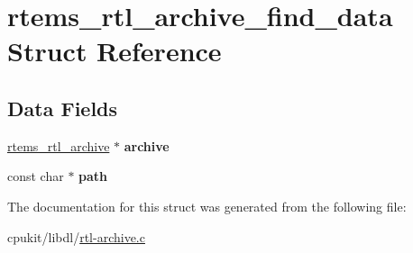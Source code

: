 \hypertarget{structrtems__rtl__archive__find__data}{}\section{rtems\+\_\+rtl\+\_\+archive\+\_\+find\+\_\+data Struct Reference}
\label{structrtems__rtl__archive__find__data}
\subsection*{Data Fields}
\begin{DoxyCompactItemize}
\item 
\mbox{\label{structrtems__rtl__archive__find__data_a90373abadd9cbe344328513ab8999168}} 
\mbox{\hyperlink{structrtems__rtl__archive}{rtems\+\_\+rtl\+\_\+archive}} $\ast$ {\bfseries archive}
\item 
\mbox{\label{structrtems__rtl__archive__find__data_af5ee23bf6cc57a2029c8ffaae4575cb4}} 
const char $\ast$ {\bfseries path}
\end{DoxyCompactItemize}


The documentation for this struct was generated from the following file\+:\begin{DoxyCompactItemize}
\item 
cpukit/libdl/\mbox{\hyperlink{rtl-archive_8c}{rtl-\/archive.\+c}}\end{DoxyCompactItemize}
